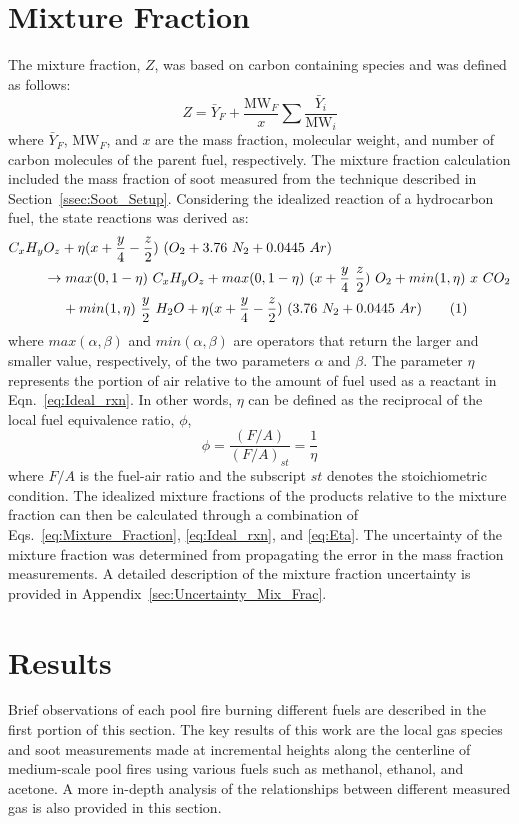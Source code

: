 \documentclass[12pt]{article}
\newcommand\numberthis{\addtocounter{equation}{1}\tag{\theequation}}
\begin{document}
\section{Mixture Fraction}
\label{sec:Mixture_Fraction}
The mixture fraction, $Z$, was based on carbon containing species and was defined as follows:
\begin{equation}\label{eq:Mixture_Fraction}
Z=\bar{Y}_{F}+\frac{{\textrm{MW}_{F}}}{x}\sum{\frac{\bar{Y}_{i}}{{\textrm{MW}_{i}}}}
\end{equation} 
where $\bar{Y}_{F}$, ${\textrm{MW}_{F}}$, and $x$ are the mass fraction, molecular weight, and number of carbon molecules of the parent fuel, respectively. The mixture fraction calculation included the mass fraction of soot measured from the technique described in Section~\ref{ssec:Soot_Setup}.
Considering the idealized reaction of a hydrocarbon fuel, the state reactions was derived as:
\begin{align*}
C_{x}H_{y}&O_{z}+\eta(x+\frac{y}{4}-\frac{z}{2})~(O_{2}+3.76~N_{2}+0.0445~Ar)\\
&\rightarrow max(0,1-\eta)~C_{x}H_{y}O_{z}+max(0,1-\eta)~(x+\frac{y}{4}~\frac{z}{2})~O_{2}+ min(1,\eta)~x~CO_{2}\\ 
&~~~~+min(1,\eta)~\frac{y}{2}~H_{2}O+\eta(x+\frac{y}{4}-\frac{z}{2})~(3.76~N_{2}+0.0445~Ar) \numberthis \label{eq:Ideal_rxn}
\end{align*}
where $max(\alpha,\beta)$ and $min(\alpha,\beta)$ are operators that return the larger and smaller value, respectively, of the two parameters $\alpha$ and $\beta$. The parameter $\eta$ represents the portion of air relative to the amount of fuel used as a reactant in Eqn.~\ref{eq:Ideal_rxn}. In other words, $\eta$ can be defined as the reciprocal of the local fuel equivalence ratio, $\phi$,
\begin{equation}\label{eq:Eta}
\phi=\frac{(F/A)}{(F/A)_{st}}=\frac{1}{\eta}
\end{equation} 
where $F/A$ is the fuel-air ratio and the subscript $st$ denotes the stoichiometric condition. The idealized mixture fractions of the products relative to the mixture fraction can then be calculated through a combination of Eqs.~\ref{eq:Mixture_Fraction}, \ref{eq:Ideal_rxn}, and \ref{eq:Eta}. The uncertainty of the mixture fraction was determined from propagating the error in the mass fraction measurements. A detailed description of the mixture fraction uncertainty is provided in Appendix~\ref{sec:Uncertainty_Mix_Frac}. 

\section{Results}
\label{sec:Results}
Brief observations of each pool fire burning different fuels are described in the first portion of this section. The key results of this work are the local gas species and soot measurements made at incremental heights along the centerline of medium-scale pool fires using various fuels such as methanol, ethanol, and acetone. A more in-depth analysis of the relationships between different measured gas is also provided in this section.
\end{document}

